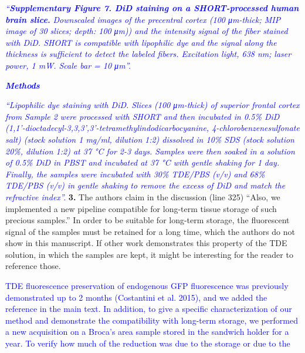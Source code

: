 \documentclass{article}
\newcommand{\reply}[1]{\textcolor{blue}{#1}}
\begin{document}
\noindent {}\reply{\emph{“}}\reply{\emph{\textbf{Supplementary Figure 7. DiD staining on a SHORT-processed human brain slice.}}} \reply{\emph{Downscaled images of the precentral cortex (100 μm-thick; MIP image of 30 slices; depth: 100}} \reply{\emph{μm)) and the intensity signal of the fiber stained with DiD. SHORT is compatible with lipophilic dye}} \reply{\emph{and the signal along the thickness is sufficient to detect the labeled fibers. Excitation light, 638 nm;}} \reply{\emph{laser power, 1 mW. Scale bar = 10 μm”.}}

\noindent \reply{\emph{\textbf{Methods}}}

\noindent \reply{\emph{“Lipophilic dye staining with DiD. Slices (100 μm-thick) of superior frontal cortex from Sample 2}} \reply{\emph{were processed with SHORT and then incubated in 0.5\% DiD (1,1'-dioctadecyl-3,3,3',3'-}}\reply{\emph{tetramethylindodicarbocyanine, 4-chlorobenzenesulfonate salt) (stock solution 1 mg/ml, dilution}} \reply{\emph{1:2) dissolved in 10\% SDS (stock solution 20\%, dilution 1:2) at 37 °C for 2-3 days. Samples were}} \reply{\emph{then soaked in a solution of 0.5\% DiD in PBST and incubated at 37 °C with gentle shaking for 1}} \reply{\emph{day. Finally, the samples were incubated with 30\% TDE/PBS (v/v) and 68\% TDE/PBS (v/v) in}} \reply{\emph{gentle shaking to remove the excess of DiD and match the refractive index”.}} \textbf{3.} The authors claim in the discussion (line 325) “Also, we implemented a new pipeline compatible for long-term tissue storage of such precious samples.” In order to be suitable for long-term storage, the fluorescent signal of the samples must be retained for a long time, which the authors do not show in this manuscript. If other work demonstrates this property of the TDE solution, in which the samples are kept, it might be interesting for the reader to reference those.

\noindent \reply{TDE fluorescence preservation of endogenous GFP fluorescence was previously demonstrated up} \reply{to 2 months (Costantini et al. 2015), and we added the reference in the main text. In addition, to} \reply{give a specific characterization of our method and demonstrate the compatibility with long-term} \reply{storage, we performed a new acquisition on a Broca’s area sample stored in the sandwich holder} \reply{for a year. To verify how much of the reduction was due to the storage or due to the}
\end{document}

